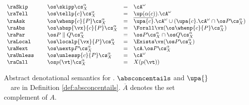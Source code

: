 \documentclass{tlp}
\begin{document}
\begin{figure}
{
$
\begin{array}{llcl}
\raSkip \ \ \ \ & \os \skipp \cs^{\alpha}_{X} & = & \cA^{\omega} \\

\raTell \ \ \ \ & \os \tellp{c} \cs^{\alpha}_{X} & = & \up(\alpha(c)).\cA^\omega \\


\raAsk \ \ \ \ & \os \whenp{c}{P} \cs^{\alpha}_{X} & = & 
\overline{\upa{c}}.\cA^\omega \cup (\upa{c}.\cA^\omega \cap \os P \cs^\alpha_X)
\\

\raAbs \ \ \ \ & \os \absp{\vx}{c}{P} \cs^{\alpha}_{X} & = & \Forall \vx  (\os \whenp{c}{P}  \cs^\alpha_X) \\ 


\raPar \ \ \ \ & \os P \parallel Q\cs^{\alpha}_{X} & = & \os P \cs^{\alpha}_{X} \cap \os Q \cs^{\alpha}_{X}  \\

\raLocal \ \ \ \ & \os \localp{\vx}{P} \cs^{\alpha}_{X} & = & \Exists \vx (  \os  P\cs^{\alpha}_X )
\\


\raNext \ \ \ \ & \os \nextp P \cs^{\alpha}_{X} & = &  \cA.\os P \cs^\alpha_X\\
\raUnless \ \ \ \ & \os \unlessp{c}{P} \cs^{\alpha}_{X} & = & \cA^\omega\\







\raCall \ \ \ \ & \os p(\vt) \cs^{\alpha}_{X} & = & X(p(\vt))
\end{array}
$
}
\caption{Abstract denotational semantics for \utcc.  $\absconcentails$ and $\upa{}$\ \  are  in Definition \ref{def:absconcentails}. $\overline{A}$ denotes the set complement of $A$.\label{absdensems}}

\end{figure}
\end{document}

